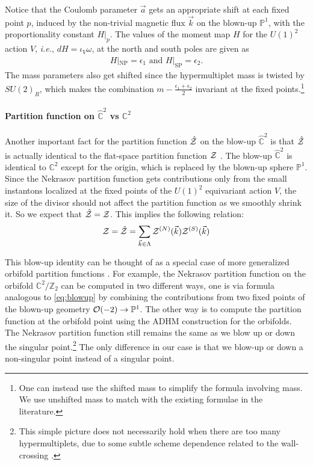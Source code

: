 \documentclass[letterpaper, 11pt]{article}
\def\IC{\mathbb{C}}
\def\IP{\mathbb{P}}
\def\IZ{\mathbb{Z}}
\def\CO{{\cal O}}
\def\CZ{{\cal Z}}
\def\e{\epsilon}
\begin{document}
Notice that the Coulomb parameter $\vec{a}$ gets an appropriate shift at each fixed point $p$, induced by the non-trivial magnetic flux $\vec{k}$ on the blown-up $\IP^1$, with the proportionality constant $H|_p$. The values of the moment map $H$ for the $U(1)^2$ action $V$,  \textit{i.e.}, $dH = \iota_V \omega$, at the north and south poles are given as
\begin{align}
  H|_\text{NP} = \epsilon_1 \text{ and } H|_\text{SP} = \epsilon_2.
\end{align}
The mass parameters also get shifted since the hypermultiplet mass is twisted by $SU(2)_R$, which makes the combination $m - \frac{\e_1+\e_2}{2}$ invariant at the fixed points.\footnote{One can instead use the shifted mass to simplify the formula involving mass. We use unshifted mass to match with the existing formulae in the literature.} 

\paragraph{Partition function on $\hat{\IC}^2$ vs $\IC^2$}
Another important fact for the partition function $\hat{\CZ}$ on the blow-up $\hat{\IC}^2$ is that $\hat{\CZ}$ is actually identical to the flat-space partition function $\CZ$  \cite{Nakajima:2003pg,Nakajima:2003uh,Nakajima:2005fg, Gottsche:2006bm, Nakajima:2009qjc, Gottsche:2010ig}.
The blow-up $\hat{\IC}^2$ is identical to $\IC^2$ except for the origin, which is replaced by the blown-up sphere $\IP^1$. 
Since the Nekrasov partition function gets contributions only from the small instantons localized at the fixed points of the $U(1)^2$ equivariant action $V$, the size of the divisor should not affect the partition function as we smoothly shrink it. So we expect that $\hat{\CZ} = \CZ$. This implies the following relation: 
\begin{align} 
  \label{eq:blowup-generic}
  \CZ = \hat{\CZ} = \sum_{\vec{k} \in \Lambda} \CZ^{(N)}(\vec{k}) \CZ^{(S)}(\vec{k})
\end{align}

This blow-up identity can be thought of as a special case of more generalized  orbifold partition functions \cite{Sasaki:2006vq,Bonelli:2012ny,Ito:2013kpa}. 
For example, the Nekrasov partition function on the orbifold $\IC^2/\IZ_2$ can be computed in two different ways, one is via formula analogous to \eqref{eq:blowup} by combining the contributions from two fixed points of the blown-up geometry $\CO(-2) \to \IP^1$. The other way is to compute the partition function at the orbifold point using the ADHM construction for the orbifolds. The Nekrasov partition function still remains the same as we blow up or down the singular point.\footnote{This simple picture does not necessarily hold when there are too many hypermultiplets, due to some subtle scheme dependence related to the wall-crossing \cite{Ito:2013kpa}.} 
The only difference in our case is that we blow-up or down a non-singular point instead of a singular point. 
\end{document}
